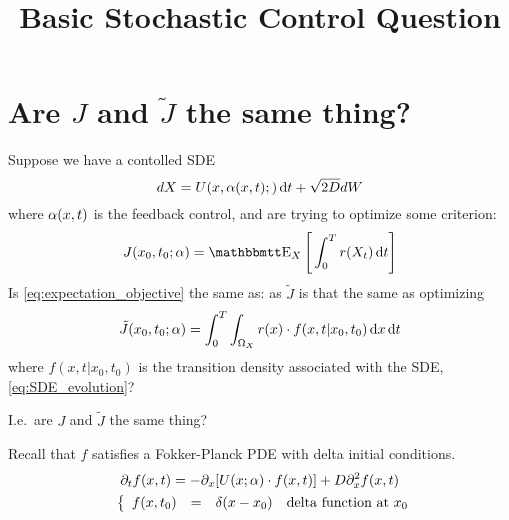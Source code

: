 \documentclass{article}
\begin{document}
\title{Basic Stochastic Control Question}

\maketitle

\section{Are $J$ and $\tilde J$ the same thing?}

Suppose  we have a contolled SDE 
\begin{equation}
dX = U(x,{\alpha}(x,t);) \, \mathrm{d} t + \sqrt{2D} dW
\label{eq:SDE_evolution} 
\end{equation}
where ${\alpha}(x,t)$ is the feedback control, and are trying to optimize some
criterion:
\begin{equation}
J(x_0, t_0; \a) = \Exp_X \Bigg[ \int_0^T r(X_t) \intd{t}\Bigg]
\label{eq:expectation_objective}
\end{equation}
Is \cref{eq:expectation_objective} the same as: as $\tilde{J}$ is that the same
as optimizing
\begin{equation}
\tilde J(x_0, t_0; {\alpha}) = \int_0^T \int_{\Omega_X} r(x)\cdot f(x,t| x_0, t_0)
\, \mathrm{d} x \, \mathrm{d} t
\label{eq:transition_objective}
\end{equation}
where $f(x,t| x_0, t_0)$ is the transition density associated with the SDE,
\cref{eq:SDE_evolution}?

I.e.\ are $J$ and $\tilde J$ the same thing?

Recall that $f$ satisfies a Fokker-Planck PDE with delta initial
conditions.
\begin{equation}
\begin{gathered}
{\partial}_t f(x,t) = -{\partial}_x [ U(x;  {\alpha}) \cdot f(x,t)] + D
{\partial}_x^2 f(x,t)
\\
\begin{array}{ll}
	& 
	\left\{ \begin{array}{lcll}
	 f(x,t_0) &=& \delta(x-x_0)  &\textrm{delta function at } x_0
\end{array} \right.
\end{array}
\label{eq:forward_density_double_well}
\end{gathered}
\end{equation}
 
\end{document}
